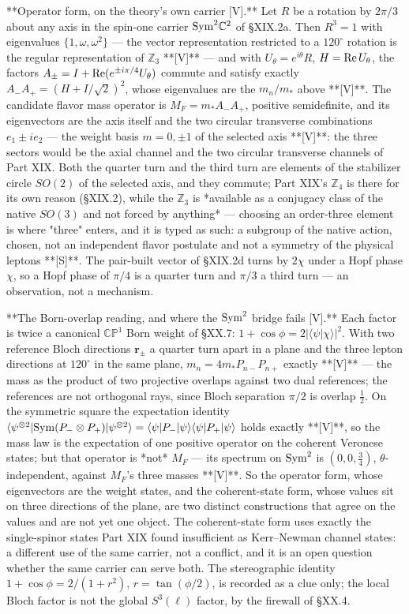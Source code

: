 **Operator form, on the theory's own carrier [V].** Let $R$ be a rotation by $2\pi/3$ about any axis in the spin-one carrier ${\rm Sym}^2\mathbb C^2$ of §XIX.2a. Then $R^3 = 1$ with eigenvalues $\{1,\omega,\omega^2\}$ — the vector representation restricted to a $120^\circ$ rotation is the regular representation of $\mathbb Z_3$ **[V]** — and with $U_\theta = e^{i\theta}R$, $H = {\rm Re}\,U_\theta$, the factors $A_\pm = I+{\rm Re}(e^{\pm i\pi/4}U_\theta)$ commute and satisfy exactly $A_-A_+ = (H+I/\sqrt2)^2$, whose eigenvalues are the $m_n/m_*$ above **[V]**. The candidate flavor mass operator is $M_F = m_*A_-A_+$, positive semidefinite, and its eigenvectors are the axis itself and the two circular transverse combinations $e_1\pm ie_2$ — the weight basis $m = 0,\pm1$ of the selected axis **[V]**: the three sectors would be the axial channel and the two circular transverse channels of Part XIX. Both the quarter turn and the third turn are elements of the stabilizer circle $SO(2)$ of the selected axis, and they commute; Part XIX's $\mathbb Z_4$ is there for its own reason (§XIX.2), while the $\mathbb Z_3$ is *available as a conjugacy class of the native $SO(3)$ and not forced by anything* — choosing an order-three element is where "three" enters, and it is typed as such: a subgroup of the native action, chosen, not an independent flavor postulate and not a symmetry of the physical leptons **[S]**. The pair-built vector of §XIX.2d turns by $2\chi$ under a Hopf phase $\chi$, so a Hopf phase of $\pi/4$ is a quarter turn and $\pi/3$ a third turn — an observation, not a mechanism.

**The Born-overlap reading, and where the ${\rm Sym}^2$ bridge fails [V].** Each factor is twice a canonical $\mathbb{CP}^1$ Born weight of §XX.7: $1+\cos\phi = 2|\langle\psi|\chi\rangle|^2$. With two reference Bloch directions $\mathbf r_\pm$ a quarter turn apart in a plane and the three lepton directions at $120^\circ$ in the same plane, $m_n = 4m_*P_{n-}P_{n+}$ exactly **[V]** — the mass as the product of two projective overlaps against two dual references; the references are not orthogonal rays, since Bloch separation $\pi/2$ is overlap $\tfrac12$. On the symmetric square the expectation identity $\langle\psi^{\otimes2}|{\rm Sym}(P_-\otimes P_+)|\psi^{\otimes2}\rangle = \langle\psi|P_-|\psi\rangle\langle\psi|P_+|\psi\rangle$ holds exactly **[V]**, so the mass law is the expectation of one positive operator on the coherent Veronese states; but that operator is *not* $M_F$ — its spectrum on ${\rm Sym}^2$ is $(0,0,\tfrac34)$, $\theta$-independent, against $M_F$'s three masses **[V]**. So the operator form, whose eigenvectors are the weight states, and the coherent-state form, whose values sit on three directions of the plane, are two distinct constructions that agree on the values and are not yet one object. The coherent-state form uses exactly the single-spinor states Part XIX found insufficient as Kerr–Newman channel states: a different use of the same carrier, not a conflict, and it is an open question whether the same carrier can serve both. The stereographic identity $1+\cos\phi = 2/(1+r^2)$, $r = \tan(\phi/2)$, is recorded as a clue only; the local Bloch factor is not the global $S^3(\ell)$ factor, by the firewall of §XX.4.

